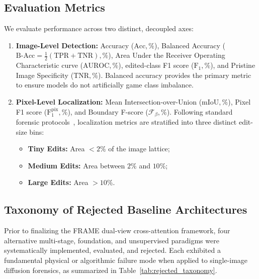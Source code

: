 \subsection{Evaluation Metrics}
We evaluate performance across two distinct, decoupled axes:
\begin{enumerate}
    \item \textbf{Image-Level Detection:} Accuracy ($\mathrm{Acc}, \%$), Balanced Accuracy ($\mathrm{B}\text{-}\mathrm{Acc} = \frac{1}{2}(\mathrm{TPR} + \mathrm{TNR}), \%$), Area Under the Receiver Operating Characteristic curve ($\mathrm{AUROC}, \%$), edited-class F1 score ($\mathrm{F}_1, \%$), and Pristine Image Specificity ($\mathrm{TNR}, \%$). Balanced accuracy provides the primary metric to ensure models do not artificially game class imbalance.
    \item \textbf{Pixel-Level Localization:} Mean Intersection-over-Union ($\mathrm{mIoU}, \%$), Pixel F1 score ($\mathrm{F}_{1}^{\mathrm{pix}}, \%$), and Boundary F-score ($\mathcal{F}_\beta, \%$). Following standard forensic protocols~\cite{opensdi,fused}, localization metrics are stratified into three distinct edit-size bins:
    \begin{itemize}
        \item \textbf{Tiny Edits:} Area $< 2\%$ of the image lattice;
        \item \textbf{Medium Edits:} Area between $2\%$ and $10\%$;
        \item \textbf{Large Edits:} Area $> 10\%$.
    \end{itemize}
\end{enumerate}

\subsection{Taxonomy of Rejected Baseline Architectures}
Prior to finalizing the FRAME dual-view cross-attention framework, four alternative multi-stage, foundation, and unsupervised paradigms were systematically implemented, evaluated, and rejected. Each exhibited a fundamental physical or algorithmic failure mode when applied to single-image diffusion forensics, as summarized in Table~\ref{tab:rejected_taxonomy}.

